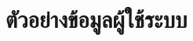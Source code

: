 \documentclass[../docs.tex]{subfiles}
\begin{document}
\section{ตัวอย่างข้อมูลผู้ใช้ระบบ}
\noindent\blindtext[3]
\end{document}
